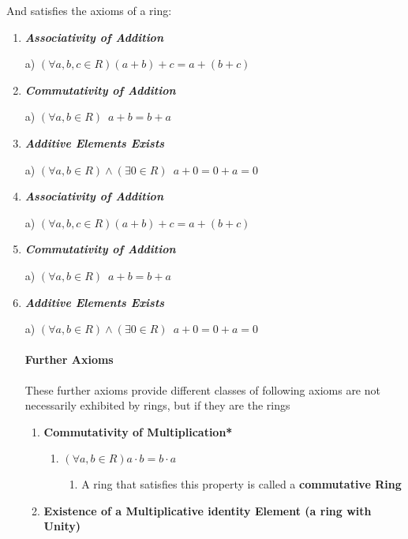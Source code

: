 \documentclass[
]{article}
\begin{document}
And satisfies the axioms of a ring:

\begin{enumerate}
\def\labelenumi{\arabic{enumi}.}
\item
  \textbf{\emph{Associativity of Addition}}

  a) \((\forall a, b, c \in R) (a+b) + c = a + (b+c)\)
\item
  \textbf{\emph{Commutativity of Addition}}

  a) \((\forall a, b \in R) \enspace a + b = b + a\)
\item
  \textbf{\emph{Additive Elements Exists}}

  a)
  \((\forall a, b \in R) \wedge (\exists0 \in R) \enspace a + 0 = 0 + a = 0\)
\item
  \textbf{\emph{Associativity of Addition}}

  a) \((\forall a, b, c \in R) (a+b) + c = a + (b+c)\)
\item
  \textbf{\emph{Commutativity of Addition}}

  a) \((\forall a, b \in R) \enspace a + b = b + a\)
\item
  \textbf{\emph{Additive Elements Exists}}

  a)
  \((\forall a, b \in R) \wedge (\exists0 \in R) \enspace a + 0 = 0 + a = 0\)

  \hypertarget{header-n737}{%
  \paragraph{Further Axioms}\label{header-n737}}

  These further axioms provide different classes of following axioms are
  not necessarily exhibited by rings, but if they are the rings

  \begin{enumerate}
  \def\labelenumii{\arabic{enumii}.}
  \item
    \textbf{Commutativity of Multiplication*}

    \begin{enumerate}
    \def\labelenumiii{\arabic{enumiii}.}
    \item
      \((\forall a,b \in R) a \cdot b = b \cdot a\)

      \begin{enumerate}
      \def\labelenumiv{\arabic{enumiv}.}
      \item
        A ring that satisfies this property is called a
        \textbf{commutative Ring}
      \end{enumerate}
    \end{enumerate}
  \item
    \textbf{Existence of a Multiplicative identity Element (a ring with
    Unity)}


\end{enumerate}
\end{enumerate}
\end{document}
